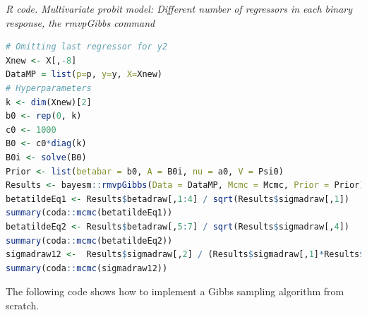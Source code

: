 \begin{enumerate}[leftmargin=*]
\begin{tcolorbox}[enhanced,width=4.67in,center upper,
	fontupper=\large\bfseries,drop shadow southwest,sharp corners]
	\textit{R code. Multivariate probit model: Different number of regressors in each binary response, the rmvpGibbs command}
	\begin{VF}
		\begin{lstlisting}[language=R]
# Omitting last regressor for y2
Xnew <- X[,-8]
DataMP = list(p=p, y=y, X=Xnew)
# Hyperparameters
k <- dim(Xnew)[2]
b0 <- rep(0, k)
c0 <- 1000
B0 <- c0*diag(k)
B0i <- solve(B0)
Prior <- list(betabar = b0, A = B0i, nu = a0, V = Psi0)
Results <- bayesm::rmvpGibbs(Data = DataMP, Mcmc = Mcmc, Prior = Prior)
betatildeEq1 <- Results$betadraw[,1:4] / sqrt(Results$sigmadraw[,1])
summary(coda::mcmc(betatildeEq1))
betatildeEq2 <- Results$betadraw[,5:7] / sqrt(Results$sigmadraw[,4])
summary(coda::mcmc(betatildeEq2))
sigmadraw12 <-  Results$sigmadraw[,2] / (Results$sigmadraw[,1]*Results$sigmadraw[,4])^0.5
summary(coda::mcmc(sigmadraw12))
\end{lstlisting}
	\end{VF}
\end{tcolorbox}

The following code shows how to implement a Gibbs sampling algorithm from scratch.


\end{enumerate}
